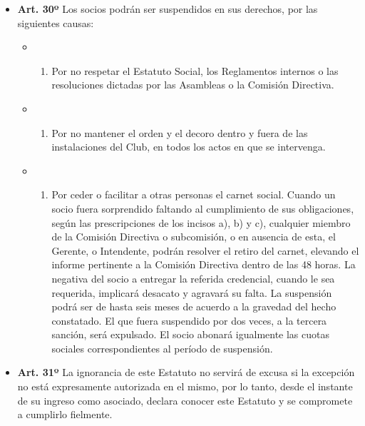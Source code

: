 \documentclass[openany]{book}
\providecommand{\tightlist}{%
  \setlength{\itemsep}{0pt}\setlength{\parskip}{0pt}}
\begin{document}
\begin{itemize}
\tightlist
\item
  \textbf{Art. 30º}
  Los socios podrán ser suspendidos en sus derechos, por las siguientes causas:

  \begin{itemize}
  \item
    \begin{enumerate}
    \def\labelenumi{\alph{enumi})}
    \tightlist
    \item
      Por no respetar el Estatuto Social, los Reglamentos internos o las resoluciones dictadas por las Asambleas o la Comisión Directiva.
    \end{enumerate}
  \item
    \begin{enumerate}
    \def\labelenumi{\alph{enumi})}
    \setcounter{enumi}{1}
    \tightlist
    \item
      Por no mantener el orden y el decoro dentro y fuera de las instalaciones del Club, en todos los actos en que se intervenga.
    \end{enumerate}
  \item
    \begin{enumerate}
    \def\labelenumi{\alph{enumi})}
    \setcounter{enumi}{2}
    \tightlist
    \item
      Por ceder o facilitar a otras personas el carnet social. Cuando un socio fuera sorprendido faltando al cumplimiento de sus obligaciones, según las prescripciones de los incisos a), b) y c), cualquier miembro de la Comisión Directiva o subcomisión, o en ausencia de esta, el Gerente, o Intendente, podrán resolver el retiro del carnet, elevando el informe pertinente a la Comisión Directiva dentro de las 48 horas. La negativa del socio a entregar la referida credencial, cuando le sea requerida, implicará desacato y agravará su falta. La suspensión podrá ser de hasta seis meses de acuerdo a la gravedad del hecho constatado. El que fuera suspendido por dos veces, a la tercera sanción, será expulsado. El socio abonará igualmente las cuotas sociales correspondientes al período de suspensión.
    \end{enumerate}
  \end{itemize}
\end{itemize}

\begin{itemize}
\tightlist
\item
  \textbf{Art. 31º}
  La ignorancia de este Estatuto no servirá de excusa si la excepción no está expresamente autorizada en el mismo, por lo tanto, desde el instante de su ingreso como asociado, declara conocer este Estatuto y se compromete a cumplirlo fielmente.
\end{itemize}
\end{document}
